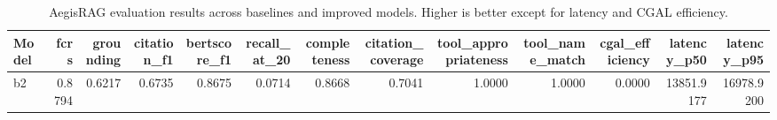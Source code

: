 \begin{table}[t]
\centering
\small
\caption{AegisRAG evaluation results across baselines and improved models. Higher is better except for latency and CGAL efficiency.}
\label{tab:aegis-results}
\begin{tabular}{lrrrrrrrrrrrr}
\toprule
Model & fcrs & grounding & citation\_f1 & bertscore\_f1 & recall\_at\_20 & completeness & citation\_coverage & tool\_appropriateness & tool\_name\_match & cgal\_efficiency & latency\_p50 & latency\_p95 \\
\midrule
b2 & 0.8794 & 0.6217 & 0.6735 & 0.8675 & 0.0714 & 0.8668 & 0.7041 & 1.0000 & 1.0000 & 0.0000 & 13851.9177 & 16978.9200 \\
\bottomrule
\end{tabular}
\end{table}